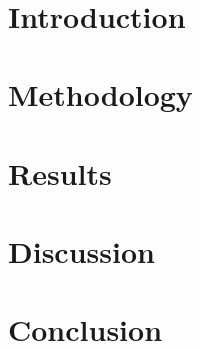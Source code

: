 \documentclass[10pt,a4paper]{article}
\begin{document}
    { \centering
    \bfseries
    \CourseNumber \quad \CourseName \quad \CourseSemester\\
    \CoursePerson\\[2\baselineskip]

    \Large
    \Title \\[1\baselineskip]
    \Author \\
    \normalfont
    \small
    \AuthorMatr \quad \AuthorProgramCode\\
    \AuthorEmail\\
    }
    \vspace{2em}


    \begin{abstract}
    \end{abstract}

    \section{Introduction}
    \section{Methodology}
    \section{Results}
    \section{Discussion}
    \section{Conclusion}
\end{document}

